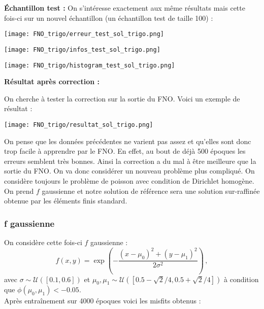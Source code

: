 \newpage

\textbf{Échantillon test :}
On s'intéresse exactement aux même résultats mais cette fois-ci sur un nouvel échantillon (un échantillon test de taille 100) :

\begin{minipage}{0.48\linewidth}
	\centering
	\texttt{[image: FNO\_trigo/erreur\_test\_sol\_trigo.png]}
\end{minipage}
\begin{minipage}{0.48\linewidth}
	\centering
	\texttt{[image: FNO\_trigo/infos\_test\_sol\_trigo.png]}
\end{minipage}

\begin{minipage}{\linewidth}
	\centering
	\texttt{[image: FNO\_trigo/histogram\_test\_sol\_trigo.png]}
\end{minipage}

\textbf{Résultat après correction : }

On cherche à tester la correction sur la sortie du FNO. Voici un exemple de résultat :

\begin{minipage}{\linewidth}
	\centering
	\texttt{[image: FNO\_trigo/resultat\_sol\_trigo.png]}
\end{minipage}


On pense que les données précédentes ne varient pas assez et qu'elles sont donc trop facile à apprendre par le FNO. En effet, au bout de déjà 500 époques les erreurs semblent très bonnes. Ainsi la correction a du mal à être meilleure que la sortie du FNO. On va donc considérer un nouveau problème plus compliqué. On considère toujours le problème de poisson avec condition de Dirichlet homogène. On prend $f$ gaussienne et notre solution de référence sera une solution sur-raffinée obtenue par les éléments finis standard.

\subsubsection{f gaussienne}

On considère cette fois-ci $f$ gaussienne :
$$f(x,y) = \exp\left(-\frac{(x-\mu_0)^2 + (y-\mu_1)^2}{2\sigma^2}\right)\,, $$ 
avec $\sigma \sim \mathcal{U}([0.1,0.6])$ et $\mu_0, \mu_1 \sim \mathcal{U}([0.5-\sqrt{2}/4, 0.5+\sqrt{2}/4])$ à condition que $\phi(\mu_0, \mu_1) < -0.05$. \\

Après entraînement sur 4000 époques voici les misfits obtenus : 

